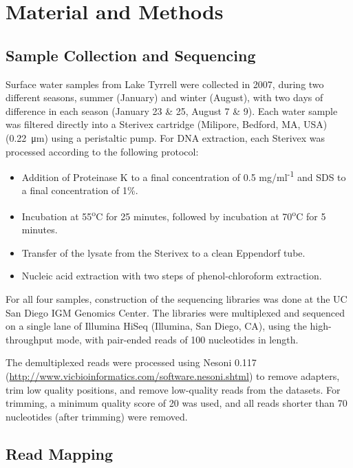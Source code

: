 \section{Material and Methods}

\subsection{Sample Collection and Sequencing}
Surface water samples from Lake Tyrrell were collected in 2007, during two different seasons, summer (January) and winter (August), with two days of difference in each season (January 23 \& 25, August 7 \& 9). Each water sample was filtered directly into a Sterivex cartridge (Milipore, Bedford, MA, USA) (\SI{0.22}{\micro\meter}) using a peristaltic pump. For DNA extraction, each Sterivex was processed according to the following protocol:

\begin{itemize}
\item Addition of Proteinase K to a final concentration of 0.5 mg/ml\textsuperscript{-1} and SDS to a final concentration of 1\%.
\item Incubation at 55\textsuperscript{o}C for 25 minutes, followed by incubation at 70\textsuperscript{o}C for 5 minutes.
\item Transfer of the lysate from the Sterivex to a clean Eppendorf tube.
\item Nucleic acid extraction with two steps of phenol-chloroform extraction. 
\end{itemize}

For all four samples, construction of the sequencing libraries was done at the UC San Diego IGM Genomics Center. The libraries were multiplexed and sequenced on a single lane of Illumina HiSeq (Illumina, San Diego, CA), using the high-throughput mode, with pair-ended reads of 100 nucleotides in length.

The demultiplexed reads were processed using Nesoni 0.117 (\url{http://www.vicbioinformatics.com/software.nesoni.shtml}) to remove adapters, trim low quality positions, and remove low-quality reads from the datasets. For trimming, a minimum quality score of 20 was used, and all reads shorter than 70 nucleotides (after trimming) were removed.

\subsection{Read Mapping}

